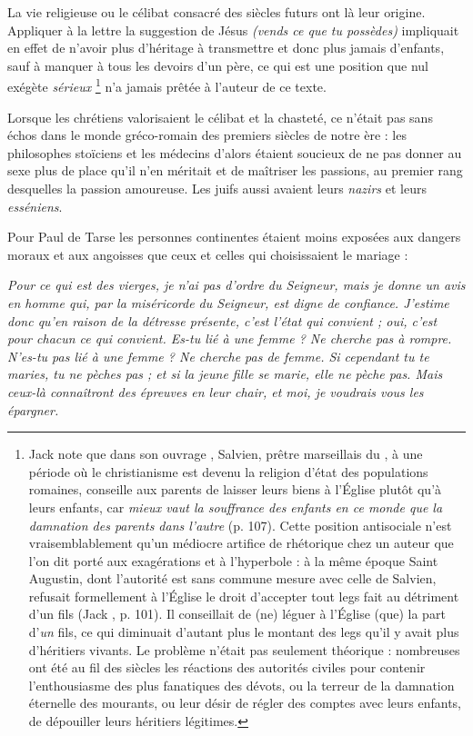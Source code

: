  La vie religieuse ou le célibat consacré des siècles futurs ont là leur origine. Appliquer à la lettre la suggestion de Jésus \emph{(vends ce que tu possèdes)} impliquait en effet de n'avoir plus d'héritage à transmettre et donc plus jamais d'enfants, sauf à manquer à tous les devoirs d'un père, ce qui est une position que nul exégète \emph{sérieux}%
\footnote{Jack  note que dans son ouvrage , Salvien, prêtre marseillais du , à une période où le christianisme est devenu la religion d'état des populations romaines, conseille aux parents de laisser leurs biens à l'Église plutôt qu'à leurs enfants, car \emph{mieux vaut la souffrance des enfants en ce monde que la damnation des parents dans l'autre} (p. 107). Cette position antisociale n'est vraisemblablement qu'un médiocre artifice de rhétorique chez un auteur que l'on dit porté aux exagérations et à l'hyperbole : à la même époque Saint Augustin, dont l'autorité est sans commune mesure avec celle de Salvien, refusait formellement à l'Église le droit d'accepter tout legs fait au détriment d'un fils (Jack , p. 101). Il conseillait de (ne) léguer à l'Église (que) la part d'\emph{un} fils, ce qui diminuait d'autant plus le montant des legs qu'il y avait plus d'héritiers vivants. Le problème n'était pas seulement théorique : nombreuses ont été au fil des siècles les réactions des autorités civiles pour contenir l'enthousiasme des plus fanatiques des dévots, ou la terreur de la damnation éternelle des mourants, ou leur désir de régler des comptes avec leurs enfants, de dépouiller leurs héritiers légitimes.}
n'a jamais prêtée à l'auteur de ce texte. 

 Lorsque les chrétiens valorisaient le célibat et la chasteté, ce n'était pas sans échos dans le monde gréco-romain des premiers siècles de notre ère : les philosophes stoïciens et les médecins d'alors étaient soucieux de ne pas donner au sexe plus de place qu'il n'en méritait et de maîtriser les passions, au premier rang desquelles la passion amoureuse. Les juifs aussi avaient leurs \emph{nazirs} et leurs \emph{esséniens}. 

 Pour Paul de Tarse les personnes continentes étaient moins exposées aux dangers moraux et aux angoisses que ceux et celles qui choisissaient le mariage :

\begin{displayquote}[I~Cor~7,~25-28]
\emph{Pour ce qui est des vierges, je n'ai pas d'ordre du Seigneur, mais je donne un avis en homme qui, par la miséricorde du Seigneur, est digne de confiance. J'estime donc qu'en raison de la détresse présente, c'est l'état qui convient ; oui, c'est pour chacun ce qui convient. Es-tu lié à une femme ? Ne cherche pas à rompre. N'es-tu pas lié à une femme ? Ne cherche pas de femme. Si cependant tu te maries, tu ne pèches pas ; et si la jeune fille se marie, elle ne pèche pas. Mais ceux-là connaîtront des épreuves en leur chair, et moi, je voudrais vous les épargner.}
\end{displayquote}

